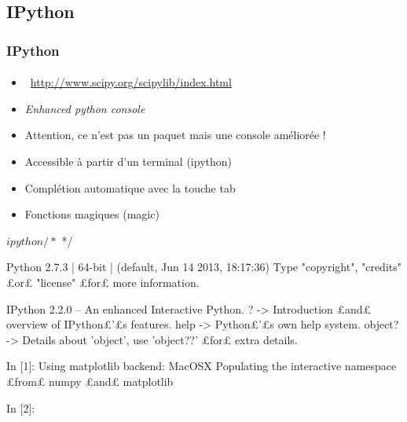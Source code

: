 \subsection{IPython}
\begin{frame}[fragile]
\frametitle{IPython}
\framesubtitle{}
\begin{itemize}
 \item {} \, \url{http://www.scipy.org/scipylib/index.html}
 \item \emph{Enhanced python console}
 \item Attention, ce n'est pas un paquet mais une console améliorée !
 \item Accessible à partir d'un terminal (ipython) 
 \item Complétion automatique avec la touche tab
 \item Fonctions magiques (magic)
\end{itemize}

\begin{shell}
$ ipython /* $ */
\end{shell} 

\begin{pythonConsole}
Python 2.7.3 | 64-bit | (default, Jun 14 2013, 18:17:36) 
Type "copyright", "credits" £or£ "license" £for£ more information.

IPython 2.2.0 -- An enhanced Interactive Python.
?         -> Introduction £and£ overview of IPython£'£s features.
help      -> Python£'£s own help system.
object?   -> Details about 'object', use 'object??' £for£ extra details.

In [1]: %
Using matplotlib backend: MacOSX
Populating the interactive namespace £from£ numpy £and£ matplotlib


In [2]: 
\end{pythonConsole}
\end{frame}
